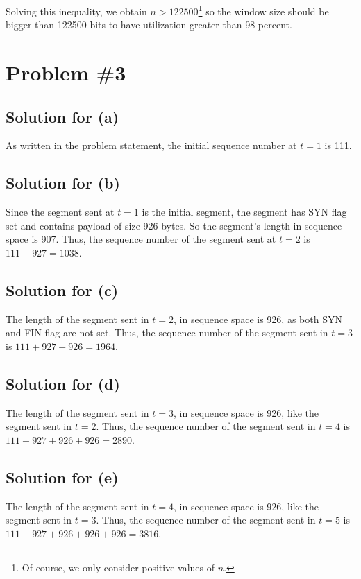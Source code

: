 \documentclass{scrartcl}
\begin{document}
Solving this inequality, we obtain \(n > 122500\)\footnote{Of course, we only
consider positive values of \(n\).} so the window size should be bigger than
122500 bits to have utilization greater than 98 percent.

\section{Problem \#3}

\subsection{Solution for (a)}

As written in the problem statement, the initial sequence number at \(t = 1\)
is 111.

\subsection{Solution for (b)}

Since the segment sent at \(t = 1\) is the initial segment, the segment has
SYN flag set and contains payload of size 926 bytes. So the segment's length in
sequence space is 907. Thus, the sequence number of the segment sent at \(t =
2\) is \(111 + 927 = 1038\).

\subsection{Solution for (c)}

The length of the segment sent in \(t = 2\), in sequence space is 926, as both
SYN and FIN flag are not set. Thus, the sequence number of the segment sent in
\(t = 3\) is \(111 + 927 + 926 = 1964\).

\subsection{Solution for (d)}

The length of the segment sent in \(t = 3\), in sequence space is 926, like the
segment sent in \(t = 2\). Thus, the sequence number of the segment sent in \(t
= 4\) is \(111 + 927 + 926 + 926 = 2890\).

\subsection{Solution for (e)}

The length of the segment sent in \(t = 4\), in sequence space is 926, like the
segment sent in \(t = 3\). Thus, the sequence number of the segment sent in \(t
= 5\) is \(111 + 927 + 926 + 926 + 926 = 3816\).
\end{document}

